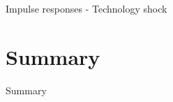 \documentclass{beamer}
\begin{document}


\begin{frame}{Impulse responses - Technology shock}

\begin{figure}[!htb]
\end{figure}
 
\end{frame}

\section{Summary}

\begin{frame}

\begin{center}
{\LARGE Summary}
\end{center}

\end{frame}


\end{document}
